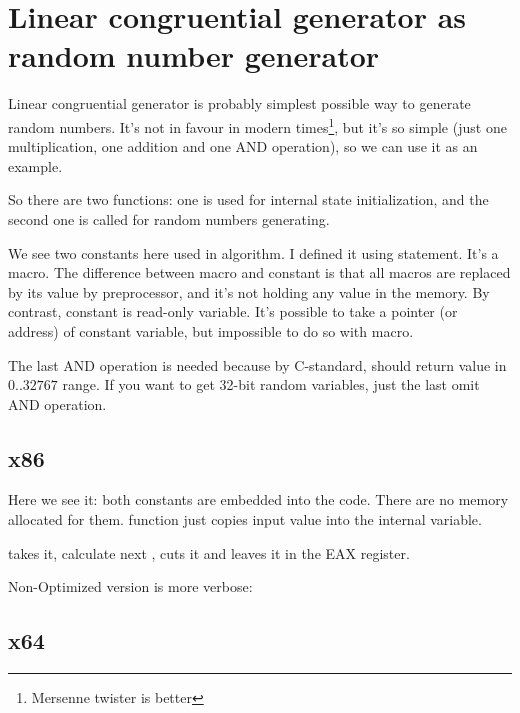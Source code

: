 \ifx\RUSSIAN\undefined
\chapter{Linear congruential generator as random number generator}

Linear congruential generator is probably simplest possible way to generate random numbers.
It's not in favour in modern times\footnote{Mersenne twister is better}, but it's so simple 
(just one multiplication, one addition and one AND operation), 
so we can use it as an example.



So there are two functions: one is used for internal state initialization, and the second one is called
for random numbers generating.

We see two constants here used in algorithm.
I defined it using  \CCpp statement. It's a macro.
The difference between \CCpp macro and constant is that all macros are replaced by its value by \CCpp preprocessor,
and it's not holding any value in the memory.
By contrast, constant is read-only variable.
It's possible to take a pointer (or address) of constant variable, but impossible to do so with macro.

The last AND operation is needed because by C-standard,  should return value in $0..32767$ range.
If you want to get 32-bit random variables, just the last omit AND operation.

\section{x86}



Here we see it: both constants are embedded into the code. There are no memory allocated for them.
 function just copies input value into the internal  variable.

 takes it, calculate next , cuts it and leaves it in the EAX register.

Non-Optimized version is more verbose:



\section{x64}

